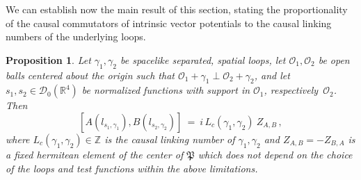 \documentclass[11pt]{article}
\newtheorem{proposition}[theorem]{Proposition}
\numberwithin{equation}{section}
\newcommand{\RR}{{\mathbb R}}
\newcommand{\ZZ}{{\mathbb Z}}
\newcommand{\Dc}{{\mathcal{D}}}
\newcommand{\Oc}{{\mathcal{O}}}
\newcommand{\fP}{{\mathfrak P}}
\begin{document}
We can establish now the main result of this section, 
stating the proportionality of the causal commutators of intrinsic 
vector potentials to the causal linking numbers of the underlying loops. 
%
\begin{proposition}
\label{prop.3.3}
Let $\gamma_1,\gamma_2$ be spacelike separated, spatial loops,  
let $\Oc_1,\Oc_2$  be open balls centered about the origin 
such that $\Oc_1 + \gamma_1 \perp \Oc_2+\gamma_2$, and 
let $s_1,s_2 \in \Dc_0(\RR^4)$ be normalized  
functions with support in $\Oc_1$, respectively~$\Oc_2$. Then 
$$
[ A(l_{s_1,\gamma_1}) , B(l_{s_2,\gamma_2}) ] 
\ = \ 
i \, L_c(\gamma_1,\gamma_2) \ Z_{A,B} \, ,
$$
where $L_c(\gamma_1,\gamma_2) \in \ZZ$ is the causal linking
number of $\gamma_1, \gamma_2$ and 
$Z_{A,B} = - Z_{B,A}$ is a fixed hermitean element of the center of $\fP$
which does not depend on the choice of the loops and
test functions within the above limitations. 
\end{proposition}
\end{document}
